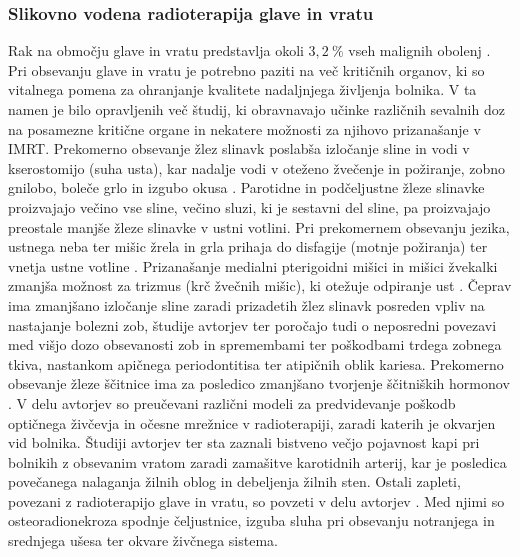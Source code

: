 \documentclass[a4paper,twoside,11pt]{article}
\begin{document}
	\subsubsection*{Slikovno vodena radioterapija glave in vratu}
	\par{
	  Rak na območju glave in vratu predstavlja okoli $3{,}2~\%$ vseh malignih obolenj \citep{torre2015}. Pri obsevanju glave in vratu je potrebno paziti na več kritičnih organov, ki so vitalnega pomena za ohranjanje kvalitete nadaljnjega življenja bolnika. V ta namen je bilo opravljenih več študij, ki obravnavajo učinke različnih sevalnih doz na posamezne kritične organe in nekatere možnosti za njihovo prizanašanje v IMRT. Prekomerno obsevanje žlez slinavk poslabša izločanje sline in vodi v kserostomijo (suha usta), kar nadalje vodi v oteženo žvečenje in požiranje, zobno gnilobo, boleče grlo in izgubo okusa \citep{bhide2009,beetz2012,marzi2012,lee2014,yuan2014,vanluijk2015,tuomikoski2015,eisbruch2009}. Parotidne in podčeljustne žleze slinavke proizvajajo večino vse sline, večino sluzi, ki je sestavni del sline, pa proizvajajo preostale manjše žleze slinavke v ustni votlini. Pri prekomernem obsevanju jezika, ustnega neba ter mišic žrela in grla prihaja do disfagije (motnje požiranja) ter vnetja ustne votline \citep{christianen2016,vanderlaan2015,dehing-oberije2010}. Prizanašanje medialni pterigoidni mišici in mišici žvekalki zmanjša možnost za trizmus (krč žvečnih mišic), ki otežuje odpiranje ust \citep{rao2016}. Čeprav ima zmanjšano izločanje sline zaradi prizadetih žlez slinavk posreden vpliv na nastajanje bolezni zob, študije avtorjev \cite{hommez2012,deng2015} ter \cite{lieshout2014} poročajo tudi o neposredni povezavi med višjo dozo obsevanosti zob in spremembami ter poškodbami trdega zobnega tkiva, nastankom apičnega periodontitisa ter atipičnih oblik kariesa. Prekomerno obsevanje žleze ščitnice ima za posledico zmanjšano tvorjenje ščitniških hormonov \citep{kim2014}. V delu avtorjev \cite{moiseenko2011} so preučevani različni modeli za predvidevanje poškodb optičnega živčevja in očesne mrežnice v radioterapiji, zaradi katerih je okvarjen vid bolnika. Študiji avtorjev \cite{scott2009} ter \cite{gujral2014} sta zaznali bistveno večjo pojavnost kapi pri bolnikih z obsevanim vratom zaradi zamašitve karotidnih arterij, kar je posledica povečanega nalaganja žilnih oblog in debeljenja žilnih sten. Ostali zapleti, povezani z radioterapijo glave in vratu, so povzeti v delu avtorjev \cite{wang2011}. Med njimi so osteoradionekroza spodnje čeljustnice, izguba sluha pri obsevanju notranjega in srednjega ušesa ter okvare živčnega sistema.
	}
\end{document}
